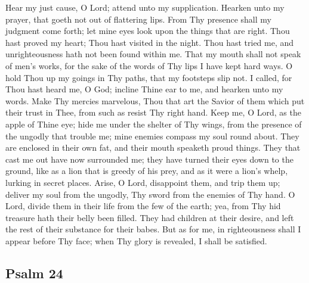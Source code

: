 Hear my just cause, O Lord; attend unto my supplication. Hearken unto my prayer, that goeth not out of flattering lips. From Thy presence shall my judgment come forth; let mine eyes look upon the things that are right. Thou hast proved my heart; Thou hast visited in the night. Thou hast tried me, and unrighteousness hath not been found within me. That my mouth shall not speak of men’s works, for the sake of the words of Thy lips I have kept hard ways. O hold Thou up my goings in Thy paths, that my footsteps slip not. I called, for Thou hast heard me, O God; incline Thine ear to me, and hearken unto my words. Make Thy mercies marvelous, Thou that art the Savior of them which put their trust in Thee, from such as resist Thy right hand. Keep me, O Lord, as the apple of Thine eye; hide me under the shelter of Thy wings, from the presence of the ungodly that trouble me; mine enemies compass my soul round about. They are enclosed in their own fat, and their mouth speaketh proud things. They that cast me out have now surrounded me; they have turned their eyes down to the ground, like as a lion that is greedy of his prey, and as it were a lion’s whelp, lurking in secret places. Arise, O Lord, disappoint them, and trip them up; deliver my soul from the ungodly, Thy sword from the enemies of Thy hand. O Lord, divide them in their life from the few of the earth; yea, from Thy hid treasure hath their belly been filled. They had children at their desire, and left the rest of their substance for their babes. But as for me, in righteousness shall I appear before Thy face; when Thy glory is revealed, I shall be satisfied.

\subsection{Psalm 24}

